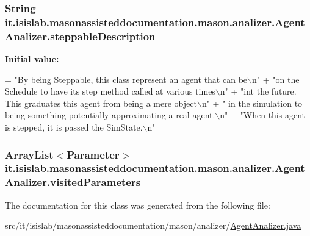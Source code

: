 \hypertarget{classit_1_1isislab_1_1masonassisteddocumentation_1_1mason_1_1analizer_1_1_agent_analizer_a5c6d63f226ee1dc2a0749c6a5ee40dd9}{
\subsubsection[{steppable\-Description}]{\setlength{\rightskip}{0pt plus 5cm}String it.\-isislab.\-masonassisteddocumentation.\-mason.\-analizer.\-Agent\-Analizer.\-steppable\-Description\hspace{0.3cm}{\ttfamily [static]}}}\label{classit_1_1isislab_1_1masonassisteddocumentation_1_1mason_1_1analizer_1_1_agent_analizer_a5c6d63f226ee1dc2a0749c6a5ee40dd9}
{\bfseries Initial value\-:}
\begin{DoxyCode}
= \textcolor{stringliteral}{"By being Steppable, this class represent an agent that can be\(\backslash\)n"}
            + \textcolor{stringliteral}{"on the Schedule to have its step method called at various times\(\backslash\)n"}
            + \textcolor{stringliteral}{"int the future. This graduates this agent from being a mere object\(\backslash\)n"}
            + \textcolor{stringliteral}{" in the simulation to being something potentially approximating a real agent.\(\backslash\)n"}
            + \textcolor{stringliteral}{"When this agent is stepped, it is passed the SimState.\(\backslash\)n"}
\end{DoxyCode}
\hypertarget{classit_1_1isislab_1_1masonassisteddocumentation_1_1mason_1_1analizer_1_1_agent_analizer_aee5454eb7063c444081bdb2556d3a60b}{
\subsubsection[{visited\-Parameters}]{\setlength{\rightskip}{0pt plus 5cm}Array\-List$<${\bf Parameter}$>$ it.\-isislab.\-masonassisteddocumentation.\-mason.\-analizer.\-Agent\-Analizer.\-visited\-Parameters\hspace{0.3cm}{\ttfamily [private]}}}\label{classit_1_1isislab_1_1masonassisteddocumentation_1_1mason_1_1analizer_1_1_agent_analizer_aee5454eb7063c444081bdb2556d3a60b}


The documentation for this class was generated from the following file\-:\begin{DoxyCompactItemize}
\item 
src/it/isislab/masonassisteddocumentation/mason/analizer/\hyperlink{_agent_analizer_8java}{Agent\-Analizer.\-java}\end{DoxyCompactItemize}
